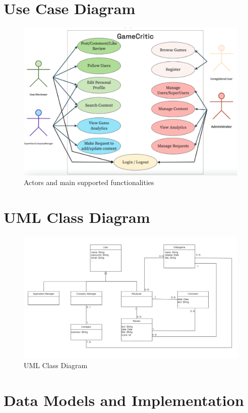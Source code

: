 \section{Use Case Diagram}
\begin{figure}[t]
	\centering
	\includegraphics[width=1\textwidth]{chapter3/img/usecase.png}
	\caption{Actors and main supported functionalities}
	\label{fig:usecase}
\end{figure}
\section{UML Class Diagram}
\begin{figure}[t]
	\centering
	\includegraphics[width=1\textwidth]{chapter3/img/uml.png}
	\caption{UML Class Diagram}
	\label{fig:uml}
\end{figure}
\section{Data Models and Implementation}
